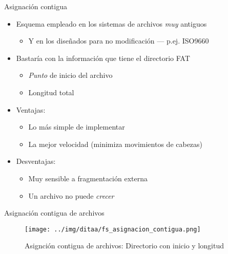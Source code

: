 \documentclass[presentation]{beamer}
\begin{document}
\begin{frame}[label={sec:org33e2907}]{Asignación contigua}
\begin{itemize}
\item Esquema empleado en los sistemas de archivos \emph{muy} antiguos
\begin{itemize}
\item Y en los diseñados para no modificación — p.ej. ISO9660
\end{itemize}
\item Bastaría con la información que tiene el directorio FAT
\begin{itemize}
\item \emph{Punto} de inicio del archivo
\item Longitud total
\end{itemize}
\item Ventajas:
\begin{itemize}
\item Lo más simple de implementar
\item La mejor velocidad (minimiza movimientos de cabezas)
\end{itemize}
\item Desventajas:
\begin{itemize}
\item Muy sensible a fragmentación externa
\item Un archivo no puede \emph{crecer}
\end{itemize}
\end{itemize}
\end{frame}

\begin{frame}[label={sec:org65e01de}]{Asignación contigua de archivos}
\begin{figure}[htbp]
\centering
\texttt{[image: ../img/ditaa/fs\_asignacion\_contigua.png]}
\caption{Asignción contigua de archivos: Directorio con inicio y longitud}
\end{figure}
\end{frame}
\end{document}
